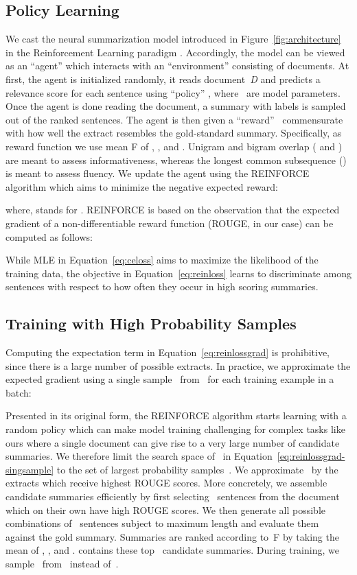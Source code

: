 \documentclass[11pt,a4paper]{article}
\newcommand\doc{{\it D }}
\begin{document}
\subsection{Policy Learning}

We cast the neural summarization model introduced in
Figure~\ref{fig:architecture} in the Reinforcement Learning paradigm
\cite{Sutton98a}. Accordingly, the model can be viewed as an ``agent''
which interacts with an ``environment'' consisting of documents. At
first, the agent is initialized randomly, it reads document~\doc and
predicts a relevance score for each sentence  using
``policy'' , where ~are model
parameters. Once the agent is done reading the document, a summary
with labels  is sampled out of the ranked sentences.  The
agent is then given a ``reward''~ commensurate with how well the
extract resembles the gold-standard summary. Specifically, as reward
function we use mean F of , ,
and . Unigram and bigram overlap ( and
) are meant to assess informativeness, whereas the
longest common subsequence () is meant to assess
fluency.
We update the agent using the REINFORCE algorithm \cite{Williams:1992}
which aims to minimize the negative expected reward:

where,  stands for . REINFORCE is based
on the observation that the expected gradient of a non-differentiable
reward function (ROUGE, in our case) can be computed as
follows:

While MLE in Equation~\eqref{eq:celoss} aims to maximize the
likelihood of the training data, the objective in
Equation~\eqref{eq:reinloss} learns to discriminate among sentences
with respect to how often they occur in high scoring summaries.


\subsection{Training with High Probability Samples}

Computing the expectation term in Equation~\eqref{eq:reinlossgrad} is
prohibitive, since there is a large number of possible extracts. In
practice, we approximate the expected gradient using a single
sample~ from~ for each training example in a
batch:



Presented in its original form, the REINFORCE algorithm starts
learning with a random policy which can make model training
challenging for complex tasks like ours where a single document can
give rise to a very large number of candidate summaries. We therefore
limit the search space of~ in
Equation~\eqref{eq:reinlossgrad-singsample} to the set of largest
probability samples~. We
approximate~ by the~ extracts which receive
highest ROUGE scores. More concretely, we assemble candidate summaries
efficiently by first selecting ~sentences from the document which
on their own have high ROUGE scores. We then generate all possible
combinations of ~sentences subject to maximum length  and
evaluate them against the gold summary. Summaries are ranked according
to~F by taking the mean of , , and
.  contains these top~ candidate
summaries.  During training, we sample~
from~ instead of~.
\end{document}
